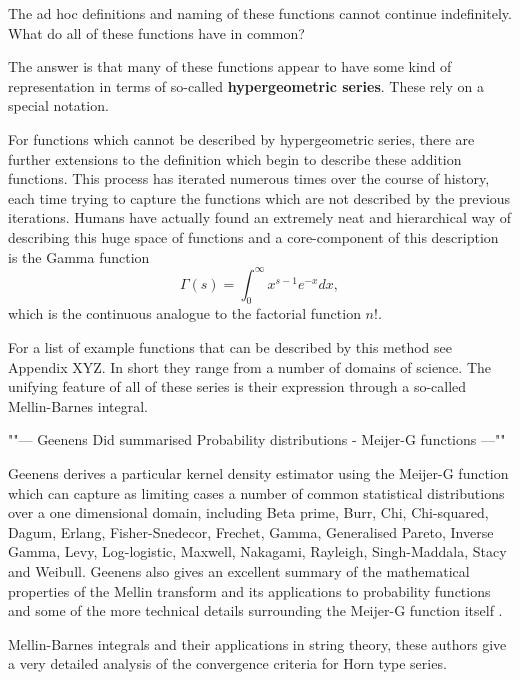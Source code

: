 \documentclass[journal=jcisd8,manuscript=article,layout=onecolumn,pdftex,floatfix,amsmath,amssymb,10pt]{achemso}
\begin{document}
The ad hoc definitions and naming of these functions cannot continue indefinitely. What do all of these functions have in common? 

The answer is that many of these functions appear to have some kind of representation in terms of so-called \textbf{hypergeometric series}. These rely on a special notation.








For functions which cannot be described by hypergeometric series, there are further extensions to the definition which begin to describe these addition functions. This process has iterated numerous times over the course of history, each time trying to capture the functions which are not described by the previous iterations. Humans have actually found an extremely neat and hierarchical way of describing this huge space of functions and a core-component of this description is the Gamma function
\begin{equation}
\Gamma(s) = \int_0^\infty x^{s-1} e^{-x}dx,
\end{equation}
which is the continuous analogue to the factorial function $n!$.

For a list of example functions that can be described by this method see Appendix XYZ. In short they range from a number of domains of science. The unifying feature of all of these series is their expression through a so-called Mellin-Barnes integral.




""--- Geenens Did summarised Probability distributions - Meijer-G functions ---""

Geenens \citep{Geenens2017} derives a particular kernel density estimator using the Meijer-G function which can capture as limiting cases a number of common statistical distributions over a one dimensional domain, including Beta prime, Burr, Chi, Chi-squared, Dagum, Erlang, Fisher-Snedecor, Frechet, Gamma, Generalised Pareto, Inverse Gamma, Levy, Log-logistic, Maxwell, Nakagami, Rayleigh, Singh-Maddala, Stacy and Weibull. Geenens also gives an excellent summary of the mathematical properties of the Mellin transform and its applications to probability functions and some of the more technical details surrounding the Meijer-G function itself \citep{Geenens2017}.

\citep{Passare1996} Mellin-Barnes integrals and their applications in string theory, these authors give a very detailed analysis of the convergence criteria for Horn type series.
\end{document}
